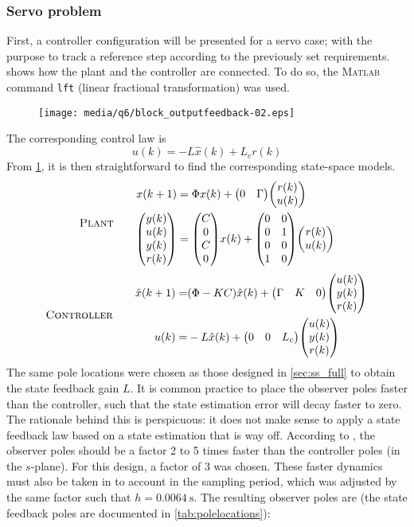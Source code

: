 \subsubsection{Servo problem}
First, a controller configuration will be presented for a servo case; with the purpose to track a reference step according to the previously set requirements.  shows how the plant and the controller are connected. To do so, the \textsc{Matlab} command \texttt{lft} (linear fractional transformation) was used.
\begin{figure}[ht]
    \centering
    \texttt{[image: media/q6/block\_outputfeedback-02.eps]}
    \caption{}
    \label{fig:q6_block_servo}
\end{figure}
The corresponding control law is
    $$u(k) = -L\hat{x}(k) + L_c r(k) $$
From \cref{fig:q6_block_servo}, it is then straightforward to find the corresponding state-space models.
\begin{equation}
    \text{\textsc{Plant}}\qquad
    \begin{aligned}
        x(k+1) &= \Phi x(k) + \mqty(0&\Gamma)\mqty(r(k)\\u(k))\\
        \mqty(y(k)\\u(k)\\y(k)\\r(k)) &= \mqty(C\\0\\C\\0)x(k) + \mqty(0&0\\0&1\\0&0\\1&0) \mqty(r(k)\\u(k))
    \end{aligned}
\end{equation}
\phantom{x}
\begin{equation}
    \text{\textsc{Controller}}\qquad
    \begin{aligned}
        \hat{x}(k+1) =& (\Phi - KC)\hat{x}(k) + \mqty(\Gamma&K&0)\mqty(u(k)\\y(k)\\r(k))\\
        u(k) =& -L\hat{x}(k) + \mqty(0&0&L_c)\mqty(u(k)\\y(k)\\r(k))
    \end{aligned}
\end{equation}
The same pole locations were chosen as those designed in \cref{sec:ss_full} to obtain the state feedback gain $L$. It is common practice to place the observer poles faster than the controller, such that the state estimation error will decay faster to zero. The rationale behind this is perspicuous: it does not make sense to apply a state feedback law based on a state estimation that is way off. According to \textcite{ogata}, the observer poles should be a factor 2 to 5 times faster than the controller poles (in the $s$-plane). For this design, a factor of 3 was chosen. These faster dynamics must also be taken in to account in the sampling period, which was adjusted by the same factor such that $h = \SI{0.0064}{\second}$. The resulting observer poles are (the state feedback poles are documented in \cref{tab:polelocations}):
